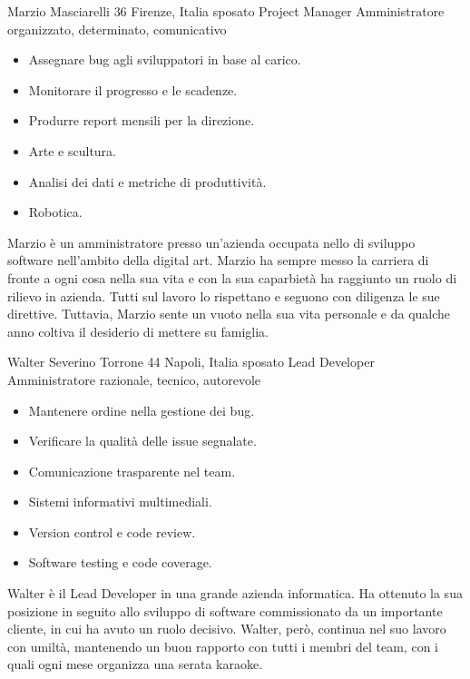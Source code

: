 \begin{personaenv}
  {Marzio Masciarelli}
  {36}
  {Firenze, Italia}
  {sposato}
  {Project Manager}
  {Amministratore}
  {organizzato, determinato, comunicativo}
  {\begin{itemize}
    \item Assegnare bug agli sviluppatori in base al carico.
    \item Monitorare il progresso e le scadenze.
    \item Produrre report mensili per la direzione.
  \end{itemize}}
  {\begin{itemize}
    \item Arte e scultura.
    \item Analisi dei dati e metriche di produttività.
    \item Robotica.
  \end{itemize}}
  {Marzio è un amministratore presso un’azienda occupata nello di sviluppo software nell’ambito della digital art. 
  Marzio ha sempre messo la carriera di fronte a ogni cosa nella sua vita e con la sua  caparbietà ha raggiunto un ruolo di 
  rilievo in azienda. Tutti sul lavoro lo rispettano e seguono con diligenza le sue direttive. Tuttavia, Marzio sente un 
  vuoto nella sua vita personale e da qualche anno coltiva il desiderio di mettere su famiglia.}
\end{personaenv}

\begin{personaenv}
  {Walter Severino Torrone}
  {44}
  {Napoli, Italia}
  {sposato}
  {Lead Developer}
  {Amministratore}
  {razionale, tecnico, autorevole}
  {\begin{itemize}
    \item Mantenere ordine nella gestione dei bug.
    \item Verificare la qualità delle issue segnalate.
    \item Comunicazione trasparente nel team.
  \end{itemize}}
  {\begin{itemize}
    \item Sistemi informativi multimediali.
    \item Version control e code review.
    \item Software testing e code coverage.
  \end{itemize}}  
  {Walter è il Lead Developer in una grande azienda informatica. Ha ottenuto la sua posizione in seguito allo sviluppo di 
  software commissionato da un importante cliente, in cui ha avuto un ruolo decisivo. Walter, però, continua nel suo lavoro 
  con umiltà, mantenendo un buon rapporto con tutti i membri del team, con i quali ogni mese organizza una serata karaoke.}
\end{personaenv}

